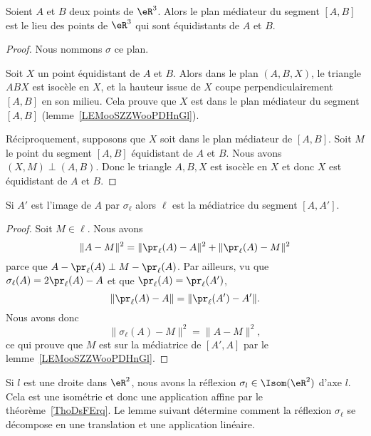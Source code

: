 \begin{lemma}       \label{LEMooVBVUooOTFFXT}
	Soient \( A\) et \( B\) deux points de \( \eR^3\). Alors le plan médiateur du segment \( [A,B]\) est le lieu des points de \( \eR^3\) qui sont équidistants de \( A\) et \( B\).
\end{lemma}

\begin{proof}
	Nous nommons \( \sigma\) ce plan.

	Soit \( X\) un point équidistant de \( A\) et \( B\). Alors dans le plan \( (A,B,X)\), le triangle \( ABX\) est isocèle en \( X\), et la hauteur issue de \( X\) coupe perpendiculairement \( [A,B]\) en son milieu. Cela prouve que \( X\) est dans le plan médiateur du segment \( [A,B]\) (lemme~\ref{LEMooSZZWooPDHnGl}).

	Réciproquement, supposons que \( X\) soit dans le plan médiateur de \( [A,B]\). Soit \( M\) le point du segment \( [A,B]\) équidistant de \( A\) et \( B\). Nous avons \( (X,M)\perp (A,B)\). Donc le triangle \( A,B,X\) est isocèle en \( X\) et donc \( X\) est équidistant de \( A\) et \( B\).
\end{proof}

\begin{lemma}       \label{LEMooTCIEooXdyuHu}
	Si \( A'\) est l'image de \( A\) par \( \sigma_{\ell}\) alors \( \ell\) est la médiatrice du segment \( [A,A']\).
\end{lemma}

\begin{proof}
	Soit \( M\in\ell\). Nous avons
	\begin{equation}
		\| A-M \|^2=\| \pr_{\ell}(A)-A \|^2+\| \pr_{\ell}(A)-M \|^2
	\end{equation}
	parce que \( A-\pr_{\ell}(A)\perp M-\pr_{\ell}(A)\). Par ailleurs, vu que \( \sigma_{\ell}(A)=2\pr_{\ell}(A)-A\) et que \( \pr_{\ell}(A)=\pr_{\ell}(A')\),
	\begin{equation}
		\| \pr_{\ell}(A)-A \|=\| \pr_{\ell}(A')-A' \|.
	\end{equation}
	Nous avons donc
	\begin{equation}
		\| \sigma_{\ell}(A)-M \|^2=\| A-M \|^2,
	\end{equation}
	ce qui prouve que \( M\) est sur la médiatrice de \( [A',A]\) par le lemme~\ref{LEMooSZZWooPDHnGl}.
\end{proof}

\begin{normaltext}
	Si \( l\) est une droite dans \( \eR^2\), nous avons la réflexion \( \sigma_l\in\Isom(\eR^2)\) d'axe \( l\). Cela est une isométrie et donc une application affine par le théorème~\ref{ThoDsFErq}. Le lemme suivant détermine comment la réflexion \( \sigma_{\ell}\) se décompose en une translation et une application linéaire.
\end{normaltext}

